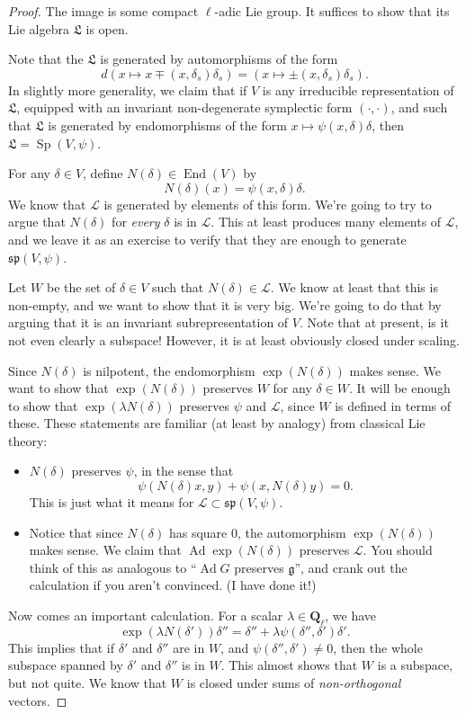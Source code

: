 \documentclass[letterpaper,11pt]{article}
\newcommand{\Q}{\mathbf{Q}}
\newcommand{\mf}[1]{\mathfrak{#1}}
\newcommand{\Cal}[1]{\mathcal{#1}}
\DeclareMathOperator{\Sp}{Sp}
\DeclareMathOperator{\End}{End}
\DeclareMathOperator{\Ad}{Ad}
\begin{document}
\begin{proof}
The image is some compact $\ell$-adic Lie group. It suffices to show that its Lie algebra $\mf{L}$ is open. 

Note that the $\mf{L}$ is generated by automorphisms of the form
\[
d(x \mapsto x \mp (x, \delta_s) \delta_s) = (x \mapsto \pm (x, \delta_s) \delta_s).
\]
In slightly more generality, we claim that if $V$ is any irreducible representation of $\mf{L}$, equipped with an invariant non-degenerate symplectic form $(\cdot, \cdot)$, and such that $\mf{L}$ is generated by endomorphisms of the form $x \mapsto \psi(x, \delta) \delta$, then $\mf{L} = \Sp(V, \psi)$. 


For any $\delta \in V$, define $N(\delta) \in \End(V)$ by 
\[
N(\delta)(x) = \psi(x, \delta) \delta. 
\]
We know that $\Cal{L}$ is generated by elements of this form. We're going to try to argue that $N(\delta)$ for \emph{every} $\delta$ is in $\Cal{L}$. This at least produces many elements of $\Cal{L}$, and we leave it as an exercise to verify that they are enough to generate $\mf{sp}(V, \psi)$. 


Let $W$ be the set of $\delta \in V$ such that $N(\delta) \in \Cal{L}$. We know at least that this is non-empty, and we want to show that it is very big. We're going to do that by arguing that it is an invariant subrepresentation of $V$. Note that at present, is it not even clearly a subspace! However, it is at least obviously closed under scaling. 

Since $N(\delta)$ is nilpotent, the endomorphism $\exp(N(\delta))$ makes sense. We want to show that $\exp( N(\delta))$ preserves $W$ for any $\delta  \in W$. It will be enough to show that $\exp(\lambda N(\delta))$ preserves $\psi$ and $\Cal{L}$, since $W$ is defined in terms of these. These statements are familiar (at least by analogy) from classical Lie theory: 
\begin{itemize}
\item $N(\delta)$ preserves $\psi$, in the sense that 
\[
\psi(N(\delta) x, y) + \psi(x, N(\delta) y) = 0.
\]
This is just what it means for $\Cal{L} \subset \mf{sp}(V, \psi)$. 
\item Notice that since $N(\delta)$ has square $0$, the automorphism $\exp(N (\delta))$ makes sense. We claim that $\Ad \exp(N (\delta))$ preserves $\Cal{L}$. You should think of this as analogous to ``$\Ad G$ preserves $\mf{g}$'', and crank out the calculation if you aren't convinced. (I have done it!) 
\end{itemize}
Now comes an important calculation. For a scalar $\lambda \in \Q_{\ell}$, we have 
\[
\exp(\lambda N(\delta')) \delta'' = \delta'' + \lambda \psi(\delta'', \delta')\delta'. 
\]
This implies that if $\delta'$ and $\delta''$ are in $W$, and $\psi(\delta'', \delta') \neq 0$, then the whole subspace spanned by $\delta'$ and $\delta''$ is in $W$. This almost shows that $W$ is a subspace, but not quite. We know that $W$ is closed under sums of \emph{non-orthogonal} vectors. 


\end{proof}
\end{document}
